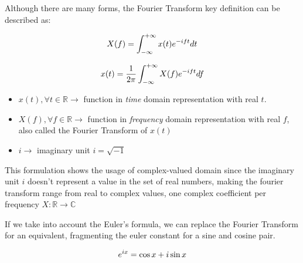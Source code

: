 \documentclass[
  oneside,
  11pt, a4paper,
  footinclude=true,
  headinclude=true,
  cleardoublepage=empty
]{scrbook}
\newcommand{\eqname}[1]{\tag*{#1}}%
\begin{document}
Although there are many forms, the Fourier Transform key definition can be described as:

\begin{equation} \label{eq1}
    X(f) = \int_{-\infty}^{+\infty} x(t)e^{-i f t} dt \\ %
\end{equation}

\begin{equation} \label{eq2}
        x(t) = \frac{1}{2\pi} \int_{-\infty}^{+\infty} X(f)e^{-i f t} df \\ %
\end{equation}

\begin{itemize}
    \item \( x(t), \forall t \in \mathbb{R} \rightarrow \) function in \textit{time} domain representation with real \( t \).
    \item \( X(f), \forall f \in \mathbb{R} \rightarrow \) function in \textit{frequency} domain representation with real \( f \), also called the Fourier Transform of \( x(t) \)
    \item \( i \rightarrow \) imaginary unit \( i = \sqrt{-1} \)
\end{itemize}

This formulation shows the usage of complex-valued domain since the imaginary unit \( i \) doesn't represent a value in the set of real numbers, making the fourier transform range from real to complex values, one complex coefficient per frequency \( X : \mathbb{R} \rightarrow \mathbb{C} \) 

If we take into account the Euler's formula, we can replace the Fourier Transform for an equivalent, fragmenting the euler constant for a sine and cosine pair.

\begin{equation} \label{euler_formula}
    e^{ix} = \cos x + i \sin x \\ %
\end{equation}
\end{document}
